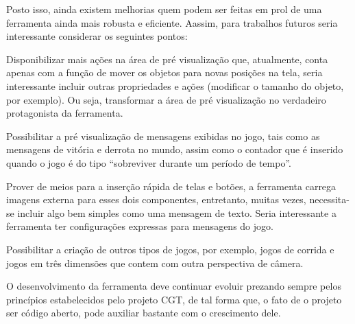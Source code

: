 \documentclass[12pt,oneside,openright,a4paper,english,brazil,sumario=tradicional]{abntex2}
\begin{document}
Posto isso, ainda existem melhorias quem podem ser feitas em prol de uma ferramenta ainda mais robusta e eficiente. Aassim, para trabalhos futuros seria interessante considerar os seguintes pontos:
\begin{alineas}
\item Disponibilizar mais ações na área de pré visualização que, atualmente, conta apenas com a função de mover os objetos para novas posições na tela, seria interessante incluir outras propriedades e ações (modificar o tamanho do objeto, por exemplo). Ou seja, transformar a área de pré visualização no verdadeiro protagonista da ferramenta.
\item Possibilitar a pré visualização de mensagens exibidas no jogo, tais como as mensagens de vitória e derrota no mundo, assim como o contador que é inserido quando o jogo é do tipo ``sobreviver durante um período de tempo''.
\item Prover de meios para a inserção rápida de telas e botões, a ferramenta carrega imagens externa para esses dois componentes, entretanto, muitas vezes, necessita-se incluir algo bem simples como uma mensagem de texto. Seria interessante a ferramenta ter configurações expressas para mensagens do jogo.
\item Possibilitar a criação de outros tipos de jogos, por exemplo, jogos de corrida e jogos em três dimensões que contem com outra perspectiva de câmera.
\end{alineas}

O desenvolvimento da ferramenta deve continuar evoluir prezando sempre pelos princípios estabelecidos pelo projeto CGT, de tal forma que, o fato de o projeto ser código aberto, pode auxiliar bastante com o crescimento dele.



\postextual

\end{document}
